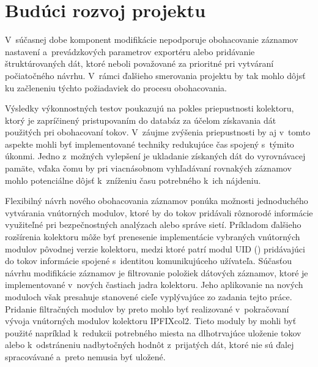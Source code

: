 \section{Budúci rozvoj projektu}

V~súčasnej dobe komponent modifikácie nepodporuje obohacovanie záznamov nastavení a~prevádzkových parametrov exportéru alebo pridávanie štruktúrovaných dát, ktoré neboli považované za prioritné pri vytváraní počiatočného návrhu. V~rámci ďalšieho smerovania projektu by tak
mohlo dôjsť ku začleneniu týchto požiadaviek do procesu obohacovania.

Výsledky výkonnostných testov poukazujú na pokles priepustnosti kolektoru, ktorý je zapríčinený pristupovaním do databáz za účelom získavania dát použitých pri obohacovaní tokov. V~záujme zvýšenia priepustnosti by aj v~tomto aspekte mohli byť
implementované techniky redukujúce čas spojený s~týmito úkonmi. Jedno z~možných vylepšení je ukladanie získaných dát do vyrovnávacej pamäte, vďaka čomu by pri viacnásobnom vyhľadávaní rovnakých záznamov mohlo potenciálne dôjsť k~zníženiu času
potrebného k~ich nájdeniu.

Flexibilný návrh nového obohacovania záznamov ponúka možnosti jednoduchého vytvárania vnútorných modulov, ktoré by do tokov pridávali rôznorodé informácie využiteľné pri bezpečnostných analýzach alebo správe sietí. Príkladom ďalšieho rozšírenia kolektoru môže byť prenesenie implementácie
vybraných vnútorných modulov pôvodnej verzie kolektoru, medzi ktoré patrí modul UID () pridávajúci do tokov informácie spojené s~identitou komunikujúceho užívateľa.
Súčasťou návrhu modifikácie záznamov je filtrovanie položiek dátových záznamov, ktoré je implementované v~nových častiach jadra kolektoru. Jeho aplikovanie na nových moduloch však presahuje stanovené cieľe vyplývajúce zo zadania tejto práce.
Pridanie filtračných modulov by preto mohlo byť realizované v~pokračovaní vývoja vnútorných modulov kolektoru IPFIXcol2. Tieto moduly by mohli byť použité napríklad k~redukcii potrebného miesta na dlhotrvajúce uloženie tokov alebo k~odstráneniu nadbytočných hodnôt z~prijatých dát, ktoré nie sú
ďalej spracovávané a~preto nemusia byť uložené.


